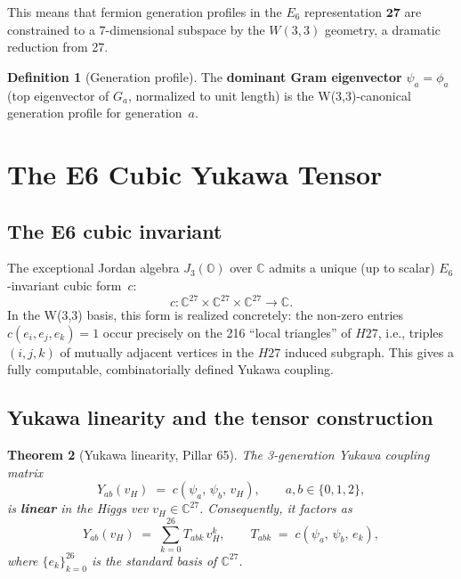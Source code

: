 \documentclass[11pt,a4paper]{article}
\newtheorem{theorem}{Theorem}[section]
\theoremstyle{definition}
\newtheorem{definition}[theorem]{Definition}
\theoremstyle{remark}
\newcommand{\CC}{\mathbb{C}}
\begin{document}
This means that fermion generation profiles in the $E_6$ representation
$\mathbf{27}$ are constrained to a 7-dimensional subspace by the $W(3{,}3)$ geometry,
a dramatic reduction from 27.

\begin{definition}[Generation profile]
The \textbf{dominant Gram eigenvector} $\psi_a = \phi_a$ (top eigenvector of $G_a$,
normalized to unit length) is the W(3,3)-canonical generation profile for generation~$a$.
\end{definition}

\section{The E6 Cubic Yukawa Tensor}\label{sec:yukawa}

\subsection{The E6 cubic invariant}

The exceptional Jordan algebra $J_3(\mathbb{O})$ over $\CC$ admits a unique (up to
scalar) $E_6$-invariant cubic form~$c$:
\[
    c : \CC^{27} \times \CC^{27} \times \CC^{27} \to \CC.
\]
In the W(3,3) basis, this form is realized concretely: the non-zero entries
$c(e_i, e_j, e_k) = 1$ occur precisely on the 216 ``local triangles'' of $H27$,
i.e., triples $(i,j,k)$ of mutually adjacent vertices in the $H27$ induced subgraph.
This gives a fully computable, combinatorially defined Yukawa coupling.

\subsection{Yukawa linearity and the tensor construction}

\begin{theorem}[Yukawa linearity, Pillar 65]\label{thm:yukawa_linear}
The 3-generation Yukawa coupling matrix
\[
    Y_{ab}(v_H) \;=\; c(\psi_a,\, \psi_b,\, v_H),
    \qquad a,b \in \{0,1,2\},
\]
is \textbf{linear} in the Higgs vev $v_H \in \CC^{27}$.  Consequently, it
factors as
\[
    Y_{ab}(v_H) \;=\; \sum_{k=0}^{26} T_{abk}\, v_H^k,
    \qquad
    T_{abk} \;=\; c(\psi_a,\, \psi_b,\, e_k),
\]
where $\{e_k\}_{k=0}^{26}$ is the standard basis of $\CC^{27}$.
\end{theorem}
\end{document}

